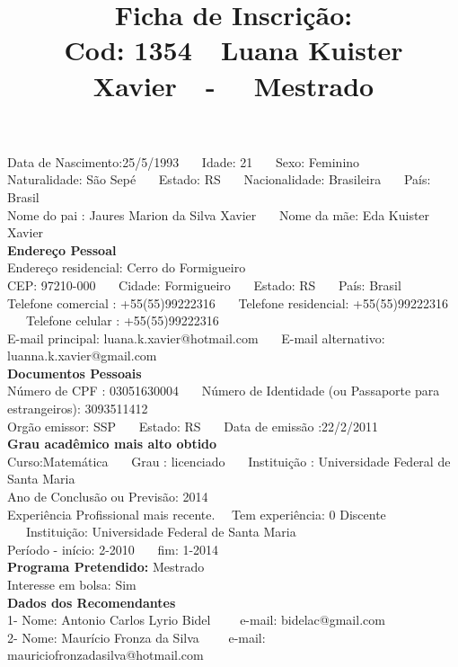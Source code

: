 \documentclass[11pt]{article}
\title{\vspace*{-4cm} Ficha de Inscrição: \\Cod: 1354\ \ Luana  Kuister Xavier\ \ - \ \ Mestrado 
 }
\date{}
\begin{document}
\maketitle
\vspace*{-1.5cm}
\noindent Data de Nascimento:25/5/1993
\ \ \ Idade: 21   \ \ \ Sexo: Feminino
\\
Naturalidade: São Sepé  
\ \ \  Estado: RS
\ \ \  Nacionalidade: Brasileira
\ \ \ País: Brasil
\\        
Nome do pai : Jaures Marion da Silva Xavier
\ \ \ Nome da mãe: Eda Kuister Xavier          
\\[0.2cm]                     
\textbf{Endereço Pessoal} 
\\ 
\noindent Endereço residencial: Cerro do Formigueiro
\\
        CEP: 97210-000 
\ \ \ Cidade: Formigueiro 
\ \ \ Estado: RS 
\ \ \ País: Brasil
\\		
		Telefone comercial : +55(55)99222316
\ \ \ Telefone residencial: +55(55)99222316
\ \ \ Telefone celular : +55(55)99222316
\\
E-mail principal: luana.k.xavier@hotmail.com
\ \ \ E-mail alternativo: luanna.k.xavier@gmail.com 
\\[0.2cm] 
\textbf{Documentos Pessoais}
\\
\noindent Número de CPF : 03051630004
\ \ \ Número de Identidade (ou Passaporte para estrangeiros): 3093511412
\\
Orgão emissor: SSP
\ \ \ Estado: RS
\ \ \ Data de emissão :22/2/2011
\\[0.3cm]
\textbf{Grau acadêmico mais alto obtido}
\\	
Curso:Matemática
\ \ \ Grau : licenciado
\ \ \ Instituição : Universidade Federal de Santa Maria
\\			
Ano de Conclusão ou Previsão: 2014
\\ 
Experiência Profissional mais recente. \ \  
Tem experiência: 0 Discente  
\ \ \ Instituição: Universidade Federal de Santa Maria
\\  
Período - início: 2-2010
\ \ \ fim: 1-2014
\\[0.2cm] 
\textbf{Programa Pretendido:} Mestrado\\
Interesse em bolsa: Sim
\\[0.3cm]		
\textbf{Dados dos Recomendantes} 
\\
1- Nome: Antonio Carlos Lyrio Bidel
\ \ \ \  e-mail: bidelac@gmail.com 
\\
2- Nome: Maurício Fronza da Silva
\ \ \ \ e-mail: mauriciofronzadasilva@hotmail.com
\end{document}
